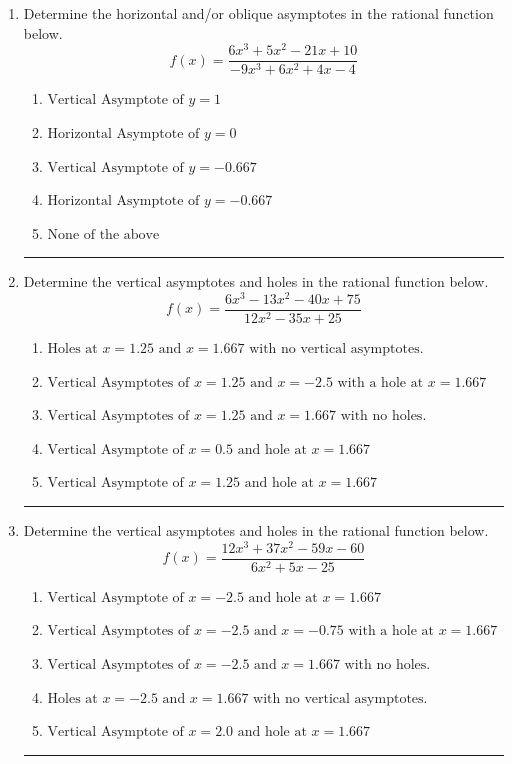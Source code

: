 \documentclass[14pt]{extbook}
\newcommand{\litem}[1]{\item#1\hspace*{-1cm}\rule{\textwidth}{0.4pt}}
\begin{document}
\begin{enumerate}
{\begin{enumerate}[label=\Alph*.]
\end{enumerate} }
\litem{
Determine the horizontal and/or oblique asymptotes in the rational function below.\[ f(x) = \frac{6x^{3} +5 x^{2} -21 x + 10}{-9x^{3} +6 x^{2} +4 x -4} \]\begin{enumerate}[label=\Alph*.]
\item \( \text{Vertical Asymptote of } y = 1  \)
\item \( \text{Horizontal Asymptote of } y = 0  \)
\item \( \text{Vertical Asymptote of } y = -0.667  \)
\item \( \text{Horizontal Asymptote of } y = -0.667  \)
\item \( \text{None of the above} \)

\end{enumerate} }
\litem{
Determine the vertical asymptotes and holes in the rational function below.\[ f(x) = \frac{6x^{3} -13 x^{2} -40 x + 75}{12x^{2} -35 x + 25} \]\begin{enumerate}[label=\Alph*.]
\item \( \text{Holes at } x = 1.25 \text{ and } x = 1.667 \text{ with no vertical asymptotes.} \)
\item \( \text{Vertical Asymptotes of } x = 1.25 \text{ and } x = -2.5 \text{ with a hole at } x = 1.667 \)
\item \( \text{Vertical Asymptotes of } x = 1.25 \text{ and } x = 1.667 \text{ with no holes.} \)
\item \( \text{Vertical Asymptote of } x = 0.5 \text{ and hole at } x = 1.667 \)
\item \( \text{Vertical Asymptote of } x = 1.25 \text{ and hole at } x = 1.667 \)

\end{enumerate} }
\litem{
Determine the vertical asymptotes and holes in the rational function below.\[ f(x) = \frac{12x^{3} +37 x^{2} -59 x -60}{6x^{2} +5 x -25} \]\begin{enumerate}[label=\Alph*.]
\item \( \text{Vertical Asymptote of } x = -2.5 \text{ and hole at } x = 1.667 \)
\item \( \text{Vertical Asymptotes of } x = -2.5 \text{ and } x = -0.75 \text{ with a hole at } x = 1.667 \)
\item \( \text{Vertical Asymptotes of } x = -2.5 \text{ and } x = 1.667 \text{ with no holes.} \)
\item \( \text{Holes at } x = -2.5 \text{ and } x = 1.667 \text{ with no vertical asymptotes.} \)
\item \( \text{Vertical Asymptote of } x = 2.0 \text{ and hole at } x = 1.667 \)

\end{enumerate} }
\end{enumerate}
\end{document}
